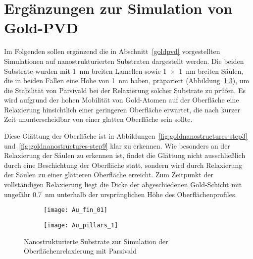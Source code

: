 \chapter{Ergänzungen zur Simulation von Gold-PVD}

Im Folgenden sollen ergänzend die in Abschnitt~\ref{goldpvd} vorgestellten Simulationen auf nanostrukturierten Substraten dargestellt werden.
Die beiden Substrate wurden mit \SI{1}{\nano\meter} breiten Lamellen sowie \SI{1x1}{\nano\meter} breiten Säulen, die in beiden Fällen eine Höhe von \SI{1}{\nano\meter} haben, präpariert (Abbildung~\ref{fig:goldnanostructures}), um die Stabilität von Parsivald bei der Relaxierung solcher Substrate zu prüfen.
Es wird aufgrund der hohen Mobilität von Gold-Atomen auf der Oberfläche eine Relaxierung hinsichtlich einer geringeren Oberfläche erwartet, die nach kurzer Zeit ununterscheidbar von einer glatten Oberfläche sein sollte.

Diese Glättung der Oberfläche ist in Abbildungen~\ref{fig:goldnanostructures-step3} und~\ref{fig:goldnanostructures-step9} klar zu erkennen.
Wie besonders an der Relaxierung der Säulen zu erkennen ist, findet die Glättung nicht ausschließlich durch eine Beschichtung der Oberfläche statt, sondern wird durch Relaxierung der Säulen zu einer glätteren Oberfläche erreicht.
Zum Zeitpunkt der vollständigen Relaxierung liegt die Dicke der abgeschiedenen Gold-Schicht mit ungefähr \SI{0.7}{\nano\meter} unterhalb der ursprünglichen Höhe des Oberflächenprofiles.

\vspace{3em}

\begin{figure}[bh]
  \captionsetup[subfigure]{singlelinecheck=false}
  \def\subfigwidth{0.49\textwidth}

  \begin{subfigure}[t]{\subfigwidth}
    \texttt{[image: Au\_fin\_01]}
    \label{fig:goldnanostructures-fins}
  \end{subfigure}
  \hfill
  \begin{subfigure}[t]{\subfigwidth}
    \texttt{[image: Au\_pillars\_1]}
    \label{fig:goldnanostructures-columns}
  \end{subfigure}

  \caption{Nanostrukturierte Substrate zur Simulation der Oberflächenrelaxierung mit Parsivald}
  \label{fig:goldnanostructures}

\end{figure}

